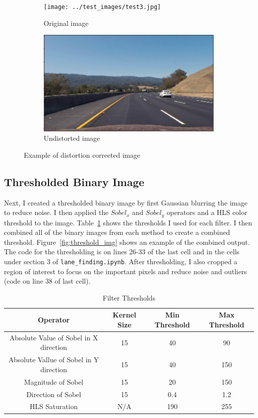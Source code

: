 \documentclass[12pt]{article}
\begin{document}
\begin{figure}[h]
\centering
\begin{subfigure}{.5\textwidth}
  \centering
  \texttt{[image: ../test\_images/test3.jpg]}
  \caption{Original image}
\end{subfigure}%
\begin{subfigure}{.5\textwidth}
  \centering
  \includegraphics[width=1\linewidth]{undistorted_test.png}
  \caption{Undistorted image}
\end{subfigure}
\caption{Example of distortion corrected image}
\label{fig:undistorted_img}
\end{figure}

\subsection{Thresholded Binary Image}
Next, I created a thresholded binary image by first Gaussian blurring the image to reduce noise. I then applied the $Sobel_x$ and $Sobel_y$ operators and a HLS color threshold to the image. Table~\ref{tab:threshold_table} shows the thresholds I used for each filter. I then combined all of the binary images from each method to create a combined threshold. Figure~\ref{fig:threshold_img} shows an example of the combined output. The code for the thresholding is on lines 26-33 of the last cell and in the cells under section 3 of \texttt{lane\_finding.ipynb}. After thresholding, I also cropped a region of interest to focus on the important pixels and reduce noise and outliers (code on line 38 of last cell).

\begin{table}[ht]
\begin{tabular}{|c | c | c | c |}
\hline
\textbf{Operator} & \textbf{Kernel Size} & \textbf{Min Threshold} & \textbf{Max Threshold} \\ \hline
Absolute Value of Sobel in X direction & 15 & 40 & 90 \\ \hline
Absolute Vallue of Sobel in Y direction & 15 & 40 & 150 \\ \hline
Magnitude of Sobel & 15 & 20 & 150 \\ \hline
Direction of Sobel & 15 & 0.4 & 1.2 \\ \hline
HLS Saturation & N/A & 190 & 255 \\ \hline
\end{tabular}
\caption{Filter Thresholds}
\label{tab:threshold_table}
\end{table}
\end{document}
